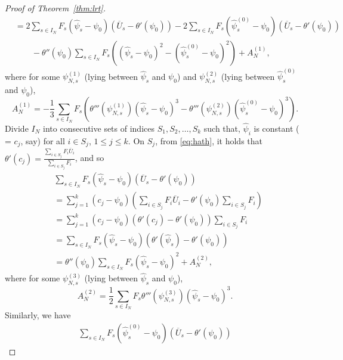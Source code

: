 \documentclass[12pt]{amsart}
\theoremstyle{plain}
\theoremstyle{remark}
\numberwithin{equation}{section}
\begin{document}
\begin{proof}[Proof of Theorem~\ref{thm:lrt}]
\begin{align}
&= 2 \sum_{s \in I_N} {F}_s\left(\hat{\psi}_{s}-{\psi}_{0}\right)\left(\overline{U}_{s} - \theta'\left(\psi_0\right)\right) - 2 \sum_{s \in I_N} {F}_s\left(\hat{\psi}_{s}^{(0)}-{\psi}_{0}\right)\left(\overline{U}_{s} - \theta'\left(\psi_0\right)\right) \nonumber\\ & \qquad -\theta''\left(\psi_0\right)\sum_{s \in I_N} {F}_s\left(\left(\hat{\psi}_{s}-\psi_0\right)^2-\left(\hat{\psi}_{s}^{(0)}-\psi_0\right)^2\right) + A^{(1)}_N,
\end{align}
where for some $\psi^{(1)}_{N,s}$ (lying between $\hat{\psi}_{s}$ and $\psi_0$) and $\psi^{(2)}_{N,s}$ (lying between $\hat{\psi}_{s}^{(0)}$ and $\psi_0$),
\[
   A^{(1)}_N = -\frac{1}{3}\sum_{s \in I_N} {F}_s\left(\theta'''\left(\psi^{(1)}_{N,s}\right)\left(\hat{\psi}_{s}-\psi_0\right)^3-\theta'''\left(\psi^{(2)}_{N,s}\right)\left(\hat{\psi}_{s}^{(0)}-\psi_0\right)^3\right).
\] 
Divide $I_{N}$ into consecutive sets of indices $S_{1}, S_{2}, \ldots, S_{k}$ such that, 
$\hat{\psi}_{i}$ is constant ( = $c_j$, say) for all $i \in S_{j}$, $1 \leq j \leq k$. On $S_{j}$, from \eqref{eq:hath}, it holds that $\theta'\left(c_{j}\right)
= \frac{\sum_{i \in S_{j}} {F}_{i} \overline{U}_{i}}{\sum_{i \in S_{j}} {F}_{i}}$, and so
\begin{align}\label{eq:ll2}
&\sum_{s \in I_N} {F}_s\left(\hat{\psi}_{s}-{\psi}_{0}\right)\left(\overline{U}_{s} - \theta'\left(\psi_0\right)\right) \nonumber
\\& = \sum_{j = 1}^k\left(c_{j}-\psi_0\right)\left(\sum_{i \in S_{j}} {{F}_{i} \overline{U}_{i}}-\theta'\left(\psi_0\right) \sum_{i \in S_{j}} {{F}_{i}}\right) \nonumber
\\ & = \sum_{j = 1}^k\left(c_{j}-\psi_0\right)\left(\theta'\left(c_j\right) - \theta'\left(\psi_{0}\right)\right) \sum_{i \in S_{j}} {{F}_{i}} \nonumber
\\ &=\sum_{s \in I_N} {F}_s\left(\hat{\psi}_{s}-{\psi}_{0}\right)\left(\theta'\left(\hat{\psi}_{s}\right) - \theta'\left(\psi_{0}\right)\right) \nonumber
\\ &=\theta''\left(\psi_0\right)\sum_{s \in I_N} {F}_s\left(\hat{\psi}_{s}-{\psi}_{0}\right)^2 + A^{(2)}_N,
\end{align}
where for some $\psi^{(3)}_{N,s}$ (lying between $\hat{\psi}_{s}$ and $\psi_0$),
\[
   A^{(2)}_N = \frac{1}{2}\sum_{s \in I_N} {F}_s\theta'''\left(\psi^{(3)}_{N,s}\right)\left(\hat{\psi}_{s}-\psi_0\right)^3.
\]
Similarly, we have
\begin{align}\label{eq:ll3}
\sum_{s \in I_N} {F}_s\left(\hat{\psi}^{(0)}_{s}-{\psi}_{0}\right)\left(\overline{U}_{s} - \theta'\left(\psi_0\right)\right)

\end{align}
\end{proof}
\end{document}
